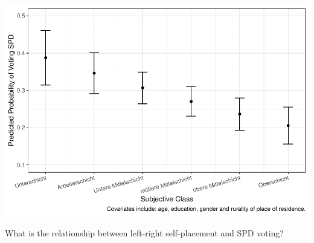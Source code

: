 \documentclass[
]{article}
\begin{document}
\includegraphics{AVCD_Final_Assignment-Edenhofer_files/figure-latex/spd-subjective-class-1.pdf}

What is the relationship between left-right self-placement and SPD
voting?
\end{document}
